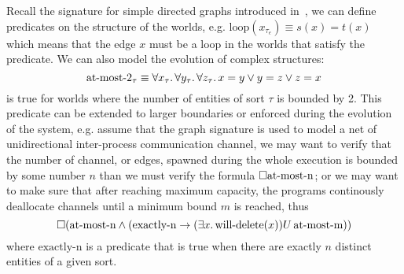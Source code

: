 \begin{example}
  Recall the signature for simple directed graphs introduced in~, we can define predicates on the
  structure of the worlds, e.g. $\text{loop}(x_{\tau_e}) \equiv s(x) = t(x)$ which means that the edge $x$ must be a
  loop in the worlds that satisfy the predicate. We can also model the evolution of complex structures: 
  \[\text{at-most-2}_\tau \equiv \forall {x_\tau} \ldotp {\forall {y_\tau} \ldotp {\forall {z_\tau} \ldotp {x = y \lor y = z \lor z = x}}}\] is
  true for worlds where the number of entities of sort $\tau$ is bounded by 2. This predicate can be extended to larger
  boundaries or enforced during the evolution of the system, e.g. assume that the graph signature is used to model a net
  of unidirectional inter-process communication channel, we may want to verify that the number of channel, or edges,
  spawned during the whole execution is bounded by some number $n$ than we must verify the formula
  $\Box{\text{at-most-n}}$; or we may want to make sure that after reaching maximum capacity, the programs
  continously deallocate channels until a minimum bound $m$ is reached, thus \[\Box{(\text{at-most-n} \land (\text{exactly-n} \to
  {(\exists {x} \ldotp {\text{will-delete}(x)})}U\,{\text{at-most-m}}))}\] where $\text{exactly-n}$ is a predicate that
  is true when there are exactly $n$ distinct entities of a given sort.
\end{example}
